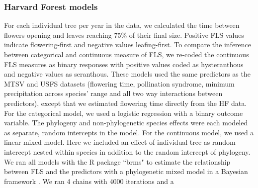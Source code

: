 \documentclass{article}\usepackage[]{graphicx}\usepackage[]{color}
\begin{document}
\subsubsection*{Harvard Forest models}
For each individual tree per year in the data, we calculated the time between flowers opening and leaves reaching 75\% of their final size. Positive FLS values indicate flowering-first and negative values leafing-first. To compare the inference between categorical and continuous measure of FLS, we re-coded the continuous FLS measures as binary responses with positive values coded as hysteranthous and negative values as seranthous. These models used the same predictors as the MTSV and USFS datasets (flowering time, pollination syndrome, minimum precipitation across species' range and all two way interactions between predictors), except that we estimated flowering time directly from the HF data. For the categorical model, we used a logistic regression with a binary outcome variable. The phylogeny and non-phylogenetic species effects were each modeled as separate, random intercepts in the model.
For the continuous model, we used a linear mixed model. Here we included an effect of individual tree as random intercept nested within species in addition to the random intercept of phylogeny. We ran all models with the R package ``brms" \citep{Burkner2018} to estimate the relationship between FLS and the predictors with a phylogenetic mixed model in a Bayesian framework \citep{Garamszegi2014}. We ran 4 chains with 4000 iterations and a
\end{document}
